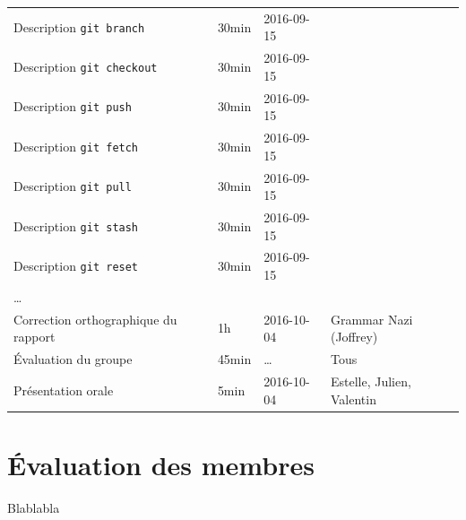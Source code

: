 \documentclass[11pt,canadien]{article}
\begin{document}
\begin{appendices}
\begin{tabular}{l l l l}
	\\ Description \texttt{git branch}      & 30min & 2016-09-15 & \karen
	\\ Description \texttt{git checkout}    & 30min & 2016-09-15 & \karen
	\\ Description \texttt{git push}        & 30min & 2016-09-15 & \kevin
	\\ Description \texttt{git fetch}       & 30min & 2016-09-15 & \kevin
	\\ Description \texttt{git pull}        & 30min & 2016-09-15 & \kevin
	\\ Description \texttt{git stash}       & 30min & 2016-09-15 & \antoine
	\\ Description \texttt{git reset}       & 30min & 2016-09-15 & \antoine
	\\ \ldots
	\\ Correction orthographique du rapport & 1h    & 2016-10-04 & Grammar Nazi (Joffrey)
	\\ Évaluation du groupe                 & 45min & \ldots     & Tous
	\\ Présentation orale                   & 5min  & 2016-10-04 & Estelle, Julien, Valentin
\end{tabular}

\section{Évaluation des membres}
Blablabla

\end{appendices}
\end{document}
